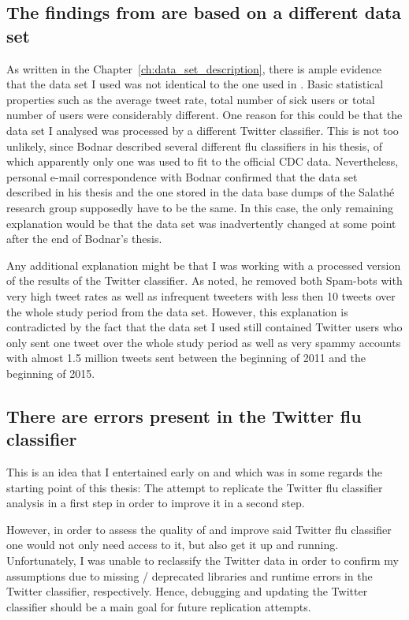\documentclass[11pt, a4paper,twoside]{report}\usepackage[]{graphicx}\usepackage[]{color}
\begin{document}
\subsection{The findings from \cite{bodnar_data_2015} are based on a different data set}
\label{sec:diff_data_set}
As written in the Chapter~\ref{ch:data_set_description}, there is ample evidence that the data set I used was not identical to the one used in \cite{bodnar_data_2015}. Basic statistical properties such as the average tweet rate, total number of sick users or total number of users were considerably different. One reason for this could be that the data set I analysed was processed by a different Twitter classifier. This is not too unlikely, since Bodnar described several different flu classifiers in his thesis, of which apparently only one was used to fit to the official CDC data. Nevertheless, personal e-mail correspondence with Bodnar confirmed that the data set described in his thesis and the one stored in the data base dumps of the Salathé research group supposedly have to be the same. In this case, the only remaining explanation would be that the data set was inadvertently changed at some point after the end of Bodnar's thesis.

Any additional explanation might be that I was working with a processed version of the results of the Twitter classifier. As \cite{bodnar_data_2015} noted, he removed both Spam-bots with very high tweet rates as well as infrequent tweeters with less then 10 tweets over the whole study period from the data set. However, this explanation is contradicted by the fact that the data set I used still contained Twitter users who only sent one tweet over the whole study period as well as very spammy accounts with almost 1.5 million tweets sent between the beginning of 2011 and the beginning of 2015.

\subsection{There are errors present in the Twitter flu classifier}
This is an idea that I entertained early on and which was in some regards the starting point of this thesis: The attempt to replicate the Twitter flu classifier analysis in a first step in order to improve it in a second step.

However, in order to assess the quality of and improve said Twitter flu classifier one would not only need access to it, but also get it up and running. Unfortunately, I was unable to reclassify the Twitter data in order to confirm my assumptions due to missing / deprecated libraries and runtime errors in the Twitter classifier, respectively. Hence, debugging and updating the Twitter classifier should be a main goal for future replication attempts.
\end{document}
